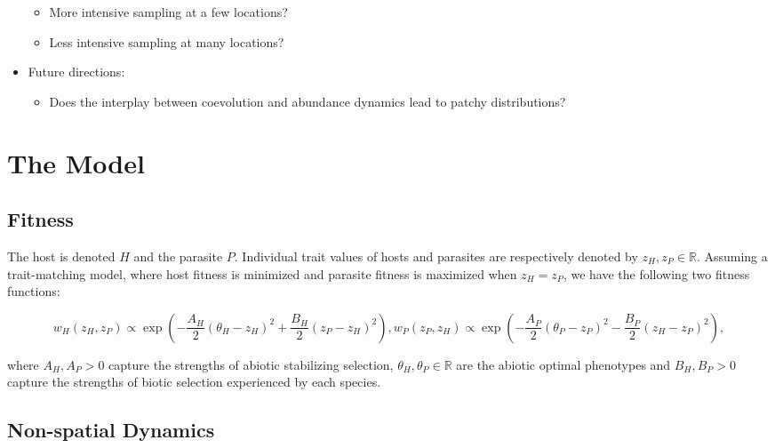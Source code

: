 \documentclass{article}
\begin{document}
\begin{itemize}
  \begin{itemize}
  \tightlist
  \item
    More intensive sampling at a few locations?
  \item
    Less intensive sampling at many locations?
  \end{itemize}
\item
  Future directions:

  \begin{itemize}
  \tightlist
  \item
    Does the interplay between coevolution and abundance dynamics lead
    to patchy distributions?
  \end{itemize}
\end{itemize}

\hypertarget{the-model}{%
\section{The Model}\label{the-model}}

\hypertarget{fitness}{%
\subsection{Fitness}\label{fitness}}

The host is denoted \(H\) and the parasite \(P\). Individual trait
values of hosts and parasites are respectively denoted by
\(z_H,z_P\in\mathbb R\). Assuming a trait-matching model, where host
fitness is minimized and parasite fitness is maximized when \(z_H=z_P\),
we have the following two fitness functions:

\begin{subequations}\label{fit}
  \begin{equation}
    w_H(z_H,z_P)\propto \exp\left(-\frac{A_H}{2}(\theta_H-z_H)^2+\frac{B_H}{2}(z_P-z_H)^2\right),
  \end{equation}
  \begin{equation}
    w_P(z_P,z_H)\propto \exp\left(-\frac{A_P}{2}(\theta_P-z_P)^2-\frac{B_P}{2}(z_H-z_P)^2\right),
  \end{equation}
\end{subequations}

where \(A_H,A_P>0\) capture the strengths of abiotic stabilizing
selection, \(\theta_H,\theta_P\in\mathbb{R}\) are the abiotic optimal
phenotypes and \(B_H,B_P>0\) capture the strengths of biotic selection
experienced by each species.

\hypertarget{non-spatial-dynamics}{%
\subsection{Non-spatial Dynamics}\label{non-spatial-dynamics}}
\end{document}
